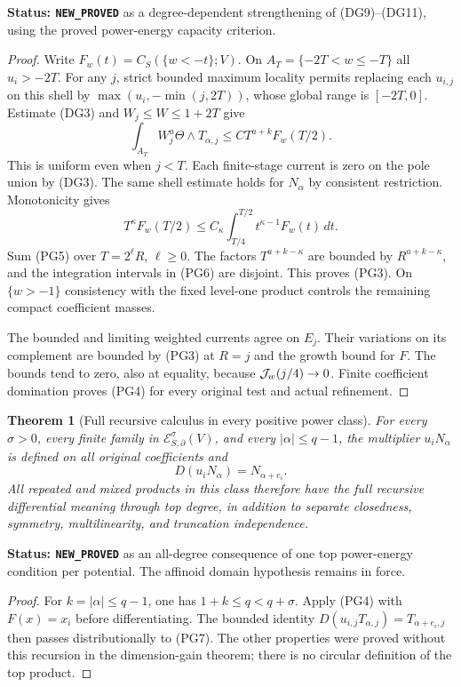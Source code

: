 \documentclass[11pt,a4paper]{article}
\numberwithin{equation}{section}
\newtheorem{theorem}{Theorem}[section]
\theoremstyle{definition}
\theoremstyle{remark}
\begin{document}
\noindent\textbf{Status: \texttt{NEW\_PROVED}} as a
degree-dependent strengthening of (DG9)--(DG11), using the
proved power-energy capacity criterion.

\begin{proof}
Write $F_w(t)=C_S(\{w<-t\};V)$. On
$A_T=\{-2T<w\leq-T\}$ all $u_i>-2T$. For any $j$, strict
bounded maximum locality permits replacing each $u_{i,j}$
on this shell by $\max(u_i,-\min(j,2T))$, whose global range
is $[-2T,0]$. Estimate (DG3) and $W_j\leq W\leq1+2T$ give
\[
 \int_{A_T}W_j^a\Theta\wedge T_{\alpha,j}
       \leq C T^{a+k}F_w(T/2).
 \tag{PG5}
\]
This is uniform even when $j<T$. Each finite-stage current is
zero on the pole union by (DG3). The same shell estimate holds
for $N_\alpha$ by consistent restriction. Monotonicity gives
\[
 T^\kappa F_w(T/2)
       \leq C_\kappa\int_{T/4}^{T/2}
                         t^{\kappa-1}F_w(t)\,dt.
 \tag{PG6}
\]
Sum (PG5) over $T=2^\ell R$, $\ell\geq0$. The factors
$T^{a+k-\kappa}$ are bounded by $R^{a+k-\kappa}$, and the
integration intervals in (PG6) are disjoint. This proves (PG3).
On $\{w>-1\}$ consistency with the fixed level-one product
controls the remaining compact coefficient masses.

The bounded and limiting weighted currents agree on $E_j$.
Their variations on its complement are bounded by (PG3) at
$R=j$ and the growth bound for $F$. The bounds tend to zero,
also at equality, because $ {\cal J}_w(j/4)\to0$.
Finite coefficient domination proves (PG4) for every original
test and actual refinement.
\end{proof}

\begin{theorem}[Full recursive calculus in every positive power class]
\label{thm:r11-power-full-recursion}
For every $\sigma>0$, every finite family in
$\mathcal E^\sigma_{S,\partial}(V)$, and every
$|\alpha|\leq q-1$, the multiplier $u_iN_\alpha$ is defined
on all original coefficients and
\[
                         D(u_iN_\alpha)=N_{\alpha+e_i}.
 \tag{PG7}
\]
All repeated and mixed products in this class therefore have
the full recursive differential meaning through top degree,
in addition to separate closedness, symmetry, multilinearity,
and truncation independence.
\end{theorem}

\noindent\textbf{Status: \texttt{NEW\_PROVED}} as an
all-degree consequence of one top power-energy condition per
potential. The affinoid domain hypothesis remains in force.

\begin{proof}
For $k=|\alpha|\leq q-1$, one has $1+k\leq q<q+\sigma$.
Apply (PG4) with $F(x)=x_i$ before differentiating. The bounded
identity $D(u_{i,j}T_{\alpha,j})=T_{\alpha+e_i,j}$ then passes
distributionally to (PG7). The other properties were proved
without this recursion in the dimension-gain theorem; there
is no circular definition of the top product.
\end{proof}
\end{document}
